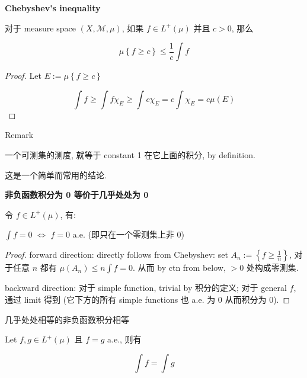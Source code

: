 \documentclass{qlnotes-export}
\begin{document}
\begin{lemma}{\protect{}\label{kn-chebyshev-inequality}{\textbf{Chebyshev's
inequality}}}

对于 measure space \((X,\mathcal{M},\mu)\), 如果 \(f \in L^{+}(\mu)\) 并且 \(c > 0\), 那么

\[\mu\left\{ {f \geq c} \right\} \leq \frac{1}{c}\int f\]

\end{lemma}

\begin{proof}

Let \(E := \mu\left\{ {f \geq c} \right\}\)

\[\int f \geq \int f\chi_{E} \geq \int c\chi_{E} = c\int\chi_{E} = c\mu(E)\]

\end{proof}

\begin{qlremark}{Remark}

一个可测集的测度, 就等于 constant 1 在它上面的积分, by definition.

这是一个简单而常用的结论.

\end{qlremark}

\begin{proposition}{\protect{}\label{kn-zero-integral-iff-zero-almost-everywhere}{\textbf{非负函数积分为
0 等价于几乎处处为 0}}}

令 \(f \in L^{+}(\mu)\), 有:

\(\int f = 0\) \(\Leftrightarrow\) \(f = 0\) a.e. (即只在一个零测集上非 0)

\end{proposition}

\begin{proof}

forward direction: directly follows from Chebyshev: set \(A_{n} := \left\{ {f \geq \frac{1}{n}} \right\}\), 对于任意 \(n\) 都有 \(\mu(A_{n}) \leq n\int f = 0\). 从而 by ctn from below, \(> 0\) 处构成零测集.

backward direction: 对于 simple function, trivial by 积分的定义; 对于 general \(f\), 通过 limit 得到 (它下方的所有 simple functions 也 a.e. 为 0 从而积分为 0).

\end{proof}

\begin{corollary}{几乎处处相等的非负函数积分相等}

Let \(f,g \in L^{+}(\mu)\) 且 \(f = g\) a.e., 则有

\[\int f = \int g\]

\end{corollary}
\end{document}
